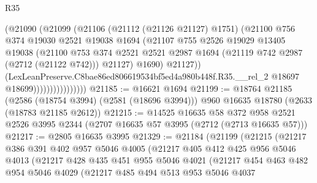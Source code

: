 \begin{lexlean}{R35}
\begin{coremodule}
                              (@21090
                                (@21099
                                  (@21106
                                    (@21112 (@21126 @21127) @1751)
                                    (@21100
                                      @756
                                      @374
                                      @19030
                                      @2521
                                      @19038
                                      @1694
                                      (@21107
                                        @755
                                        @2526
                                        @19029
                                        @13405
                                        @19038
                                        (@21100
                                          @753
                                          @374
                                          @2521
                                          @2521
                                          @2987
                                          @1694
                                          (@21119 @742 @2987 (@2712 (@21122 @742)))
                                          @21127)
                                        @1690)
                                      @21127))
                                  (LexLeanPreserve.C8bae86ed806619534bf5ed4a980b448f.R35.__rel_2
                                    @18697
                                    @18699))))))))))))))))
@21185 := @16621 @1694
@21199 := @18764
    @21185
    (@2586 (@18754 @3994) (@2581 (@18696 @3994)))
    @960
    @16635
    @18780
    (@2633 (@18783 @21185 @2612))
@21215 := @14525
    @16635
    @58
    @372
    @958
    @2521
    @2526
    @3995
    @2344
    (@2707 @16635 @57 @3995 (@2712 (@2713 @16635 @57)))
@21217 := @2805 @16635 @3995
@21329 := @21184
    (@21199
      (@21215
        (@21217
          @386
          @391
          @402
          @957
          @5046
          @4005
          (@21217
            @405
            @412
            @425
            @956
            @5046
            @4013
            (@21217
              @428
              @435
              @451
              @955
              @5046
              @4021
              (@21217
                @454
                @463
                @482
                @954
                @5046
                @4029
                (@21217
                  @485
                  @494
                  @513
                  @953
                  @5046
                  @4037

\end{coremodule}
\end{lexlean}
